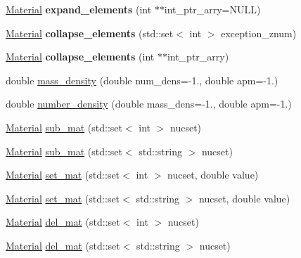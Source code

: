 \begin{DoxyCompactItemize}
\hyperlink{classpyne_1_1_material}{Material} {\bfseries expand\+\_\+elements} (int $\ast$$\ast$int\+\_\+ptr\+\_\+arry=N\+U\+LL)
\item 
\mbox{\label{classpyne_1_1_material_a87cce5b3c63e3f74c3193db856727a8c}} 
\hyperlink{classpyne_1_1_material}{Material} {\bfseries collapse\+\_\+elements} (std\+::set$<$ int $>$ exception\+\_\+znum)
\item 
\mbox{\label{classpyne_1_1_material_a58a9f43215bc0c4b826e234b2959a941}} 
\hyperlink{classpyne_1_1_material}{Material} {\bfseries collapse\+\_\+elements} (int $\ast$$\ast$int\+\_\+ptr\+\_\+arry)
\item 
double \hyperlink{classpyne_1_1_material_ac5bbc836d8b9042297444c51506b7439}{mass\+\_\+density} (double num\+\_\+dens=-\/1., double apm=-\/1.)
\item 
double \hyperlink{classpyne_1_1_material_a25bb43110ee9bd275cbe534c95713acc}{number\+\_\+density} (double mass\+\_\+dens=-\/1., double apm=-\/1.)
\item 
\hyperlink{classpyne_1_1_material}{Material} \hyperlink{classpyne_1_1_material_a50c2deb6e8513bfb101c5b2992e7f5dc}{sub\+\_\+mat} (std\+::set$<$ int $>$ nucset)
\item 
\hyperlink{classpyne_1_1_material}{Material} \hyperlink{classpyne_1_1_material_a7cd9de1e2a7a80b5beb4946667823b68}{sub\+\_\+mat} (std\+::set$<$ std\+::string $>$ nucset)
\item 
\hyperlink{classpyne_1_1_material}{Material} \hyperlink{classpyne_1_1_material_a17530f493ed5ba0d7f6e9e46c3a49744}{set\+\_\+mat} (std\+::set$<$ int $>$ nucset, double value)
\item 
\hyperlink{classpyne_1_1_material}{Material} \hyperlink{classpyne_1_1_material_a878002d7dfce0dd5a2ed518c6afc6b10}{set\+\_\+mat} (std\+::set$<$ std\+::string $>$ nucset, double value)
\item 
\hyperlink{classpyne_1_1_material}{Material} \hyperlink{classpyne_1_1_material_a34944c4d3c0627ea41d5c7631d080094}{del\+\_\+mat} (std\+::set$<$ int $>$ nucset)
\item 
\hyperlink{classpyne_1_1_material}{Material} \hyperlink{classpyne_1_1_material_a3989e723460e0acffb37163a7f7002c0}{del\+\_\+mat} (std\+::set$<$ std\+::string $>$ nucset)
\item 
\mbox{\label{classpyne_1_1_material_ae7abcf8bf30eb3b2ec862df46e792865}} 

\end{DoxyCompactItemize}
